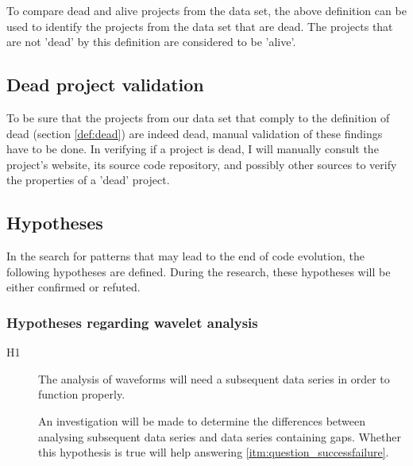To compare dead and alive projects from the data set, the above definition can
be used to identify the projects from the data set that are dead. The projects
that are not 'dead' by this definition are considered to be 'alive'.

\subsection{Dead project validation}
To be sure that the projects from our data set that comply to the definition of
dead (section \ref{def:dead}) are indeed dead, manual validation of these
findings have to be done.
In verifying if a project is dead, I will manually consult the project's
website, its source code repository, and possibly other sources to verify the
properties of a 'dead' project.

\subsection{Hypotheses}
In the search for patterns that may lead to the end of code evolution, the
following hypotheses are defined. During the research, these hypotheses will be
either confirmed or refuted.

\subsubsection{Hypotheses regarding wavelet analysis}
\begin{description}
	\item[H1\label{hyp:subsequent_data}] \hspace{0em}
	The analysis of waveforms will need a subsequent data series in order
	to function properly.

	An investigation will be made to determine the differences between analysing
	subsequent data series and data series containing gaps. Whether this
	hypothesis is true will help answering \ref{itm:question_successfailure}.
\end{description}

